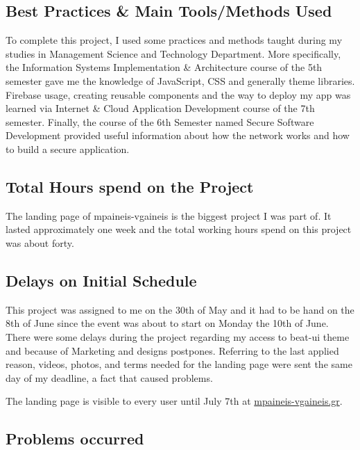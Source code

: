 \subsection{Best Practices \& Main Tools/Methods Used}

To complete this project, I used some practices and methods taught during my studies in Management Science and Technology Department. More specifically, the Information Systems Implementation \& Architecture course of the 5th semester gave me the knowledge of JavaScript, CSS and generally theme libraries. Firebase usage, creating reusable components and the way to deploy my app was learned via Internet \& Cloud Application Development course of the 7th semester. Finally, the course of the 6th Semester named Secure Software Development provided useful information about how the network works and how to build a secure application. \par

\subsection{Total Hours spend on the Project}

The landing page of mpaineis-vgaineis is the biggest project I was part of. It lasted approximately one week and the total working hours spend on this project was about forty. \par

\subsection{Delays on Initial Schedule}

This project was assigned to me on the 30th of May and it had to be hand on the 8th of June since the event was about to start on Monday the 10th of June. There were some delays during the project regarding my access to beat-ui theme and because of Marketing and designs postpones. Referring to the last applied reason, videos, photos, and terms needed for the landing page were sent the same day of my deadline, a fact that caused problems. \par

The landing page is visible to every user until July 7th at \url{mpaineis-vgaineis.gr}.

\subsection{Problems occurred}

